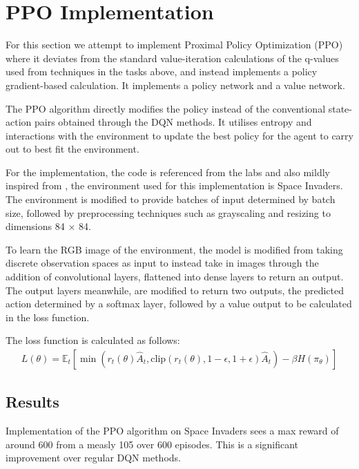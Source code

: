 \renewcommand{\thesection}{Extra Task}
\section{PPO Implementation}

For this section we attempt to implement Proximal Policy Optimization (PPO) where it deviates from the standard value-iteration calculations of the q-values used from techniques in the tasks above, and instead implements a policy gradient-based calculation. It implements a policy network and a value network. 

The PPO algorithm directly modifies the policy instead of the conventional state-action pairs obtained through the DQN methods. It utilises entropy and interactions with the environment to update the best policy for the agent to carry out to best fit the environment.

For the implementation, the code is referenced from the labs and also mildly inspired from \cite{PPO_Github}, the environment used for this implementation is Space Invaders. The environment is modified to provide batches of input determined by batch size, followed by preprocessing techniques such as grayscaling and resizing to dimensions 84 $\times$ 84. 

To learn the RGB image of the environment, the model is modified from taking discrete observation spaces as input to instead take in images through the addition of convolutional layers, flattened into dense layers to return an output. The output layers meanwhile, are modified to return two outputs, the predicted action determined by a softmax layer, followed by a value output to be calculated in the loss function.

The loss function is calculated as follows:
\begin{align*}
   L(\theta) = \mathbb{E}_t \left[ \min \left( r_t(\theta) \hat{A}_t, \text{clip}(r_t(\theta), 1 - \epsilon, 1 + \epsilon) \hat{A}_t \right) - \beta H(\pi_{\theta}) \right] 
\end{align*}

\subsection{Results}
Implementation of the PPO algorithm on Space Invaders sees a max reward of around 600 from a measly 105 over 600 episodes. This is a significant improvement over regular DQN methods.